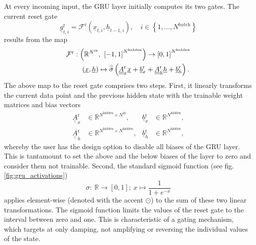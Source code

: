 At every incoming input, the GRU layer initially computes its two gates. 
The current reset gate 
\begin{equation}
    \underline g^\text{r}_{t,i} 
    =
    \mathcal{F}^\text{r} \left( \underline x_{t,i}, \underline h_{t-1,i}\right)
    ,\quad i \in \left\{1, \dots, N^\text{batch}\right\}
\end{equation}
results from the map
\begin{align} \label{eq:gru_reset}
    \mathcal{F}^\text{r}
    &:
    \left(\mathbb{R}^{N^\text{in}},\ \left[-1, 1\right]^{N^\text{hidden}}\right)
    \rightarrow
    \left[0, 1\right]^{N^\text{hidden}}
    \nonumber \\ & \quad
    \left(\underline x,\underline h\right)
    \mapsto
    \overset{\scriptscriptstyle \odot}{\sigma} \left(
        \underline{\underline A}^\text{r}_{x} \underline x
        +
        \underline b^\text{r}_{x}
        +
        \underline{\underline A}^\text{r}_{h} \underline h
        +
        \underline b^\text{r}_{h}
    \right).
\end{align}
The above map to the reset gate comprises two steps. 
First, it linearly transforms the current data point 
and the previous hidden state 
with the trainable weight matrices and bias vectors
\begin{align} \label{eq:gru_reset_params}
    \underline{\underline A}^\text{r}_{x} & \in \mathbb{R}^{
        N^\text{hidden}
        \times
        N^\text{in}
    },
    & \underline{b}^\text{r}_{x} & \in \mathbb{R}^{N^\text{hidden}},
    \nonumber \\
    \underline{\underline A}^\text{r}_{h} & \in \mathbb{R}^{
        N^\text{hidden}
        \times
        N^\text{hidden}
    },
    & \underline{b}^\text{r}_{h} & \in \mathbb{R}^{N^\text{hidden}},
\end{align}
whereby the user has the design option to disable all biases of the GRU layer.
This is tantamount to set the above and the below biases of the layer to zero 
and consider them not trainable.
Second, the standard sigmoid function \cite{Han1995} 
(see fig. \ref{fig:gru_activations})
\begin{equation} \label{eq:sigmoid}
    \sigma :\ 
    \mathbb{R} \rightarrow \left[0,1\right] ;\ 
    x \mapsto \frac{1}{1 + e^{-x}}
\end{equation}
applies element-wise (denoted with the accent $\odot$) 
to the sum of these two linear transformations.
The sigmoid function limits the values of the reset gate 
to the interval between zero and one. 
This is characteristic of a gating mechanism, 
which targets at only damping, 
not amplifying or reversing the individual values of the state.

